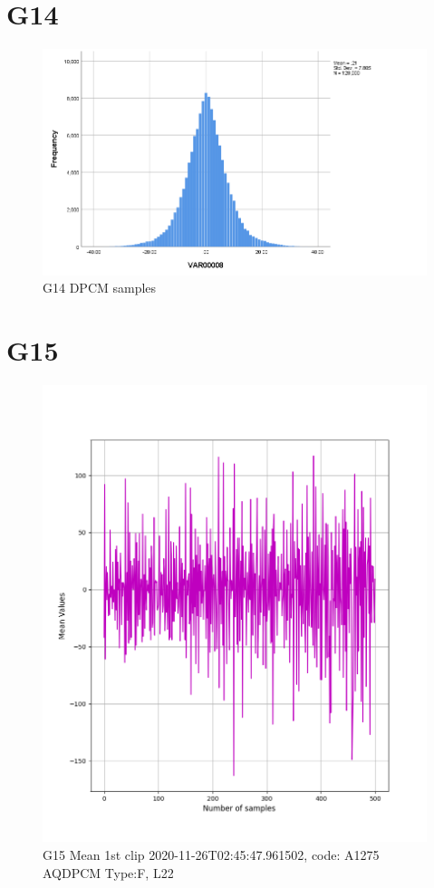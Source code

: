 \documentclass[hidelinks, 12pt, a4paper]{article}
\begin{document}
\section{G14}
\begin{figure}[h!]
	\centering
		\includegraphics[height=.4\textheight, width=\textwidth]{assets/session1/g14.png}
		\caption{G14 DPCM  samples}
	\end{figure}

\section{G15}

\begin{figure}[h!]
\centering
	\includegraphics[height=.4\textheight, width=\textwidth]{assets/session1/g15.png}
    \caption{G15 Mean 1st clip 2020-11-26T02:45:47.961502, code: A1275 AQDPCM Type:F, L22}
\end{figure}
\end{document}
